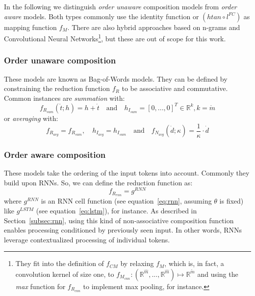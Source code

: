 In the following we distinguish \textit{order unaware} composition models from \textit{order aware} models. Both types commonly use the identity function or $(htan \circ l^{FC})$ as mapping function $f_M$. There are also hybrid approaches based on n-grams and Convolutional Neural Networks\footnote{They fit into the definition of $f_{CM}$ by relaxing $f_M$, which is, in fact, a convolution kernel of size one, to $f_{M_{cnn}}: (\mathbb{R}^{\hat{m}}, ... ,\mathbb{R}^{\hat{m}}) \mapsto \mathbb{R}^{\mathring{m}}$ and using the \textit{max} function for $f_{R_{cnn}}$ to implement max pooling, for instance.}, but these are out of scope for this work.

\subsubsection*{Order unaware composition} 
These models are known as Bag-of-Words models. They can be defined by constraining the reduction function $f_R$ to be associative and commutative. Common instances are \textit{summation} with:
\begin{equation}
f_{R_{sum}}(\mathring{t}; h) = h + \mathring{t} \quad \text{and} \quad h_{I_{sum}} = [0, ..., 0]^T \in \mathbb{R}^k, k = \mathring{m}
\end{equation}
or \textit{averaging} with: 
\begin{equation}
f_{R_{avg}} = f_{R_{sum}}, \quad h_{I_{avg}} = h_{I_{sum}} \quad \text{and} \quad f_{N_{avg}}(\dot{d}; \kappa) = \frac{1}{\kappa} \cdot \dot{d}
\end{equation}

\subsubsection*{Order aware composition} \label{subsec:order_aware_composition}
These models take the ordering of the input tokens into account. Commonly they build upon \acfp{RNN}. So, we can define the reduction function as:
\begin{equation}
f_{R_{rnn}} = g^{RNN}
\end{equation}
where $g^{RNN}$ is an \ac{RNN} cell function (see equation~\eqref{eq:rnn}, assuming $\theta$ is fixed) like $g^{LSTM}$ (see equation~\eqref{eq:lstm}), for instance. As described in Section~\ref{subsec:rnn}, using this kind of non-associative composition function enables processing conditioned by previously seen input. In other words, \acp{RNN} leverage contextualized processing of individual tokens.

